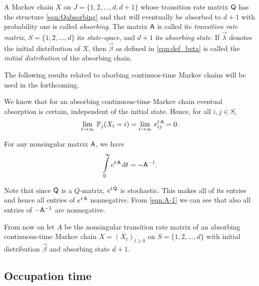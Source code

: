 \documentclass[smallextended]{svjour3}
\renewcommand{\P}{\mathbb{P}}
\newcommand{\intl}{\int\limits}
\begin{document}
\begin{definition}
A Markov chain $X$ on $J = \{1,2,\ldots,d,d+1\}$ whose transition rate matrix $\mathsf{Q}$ has the structure \eqref{eqn:Qabsorbing} and that will eventually be absorbed to $d+1$ with probability one is called \emph{absorbing}.
The matrix $\mathsf{A}$ is called its \emph{transition rate matrix}, $S=\{1,2,\ldots,d\}$ its \emph{state-space}, and $d+1$ its \emph{absorbing state}.
If $\vec{\lambda}$ denotes the initial distribution of $X$, then $\vec{\beta}$ as defined in \eqref{eqn:def_beta} is called the \emph{initial distribution} of the absorbing chain.
\end{definition}

The following results related to aborbing continuos-time Markov chains will be used in the forthcoming.

\begin{remark}\label{rem:P_vanishes}
We know that for an absorbing continuous-time Markov chain eventual absorption is certain, independent of the initial state.
Hence, for all $i,j\in S$,
\begin{equation*}
    \lim_{t\to\infty}\,\P_j(X_t=i)=\lim_{t\to\infty}\,e^{t\,\tens{A}}_{ij}=0.
\end{equation*}
\end{remark}

\begin{lemma}
    For any nonsingular matrix $\mathsf{A}$, we have
    \begin{equation}\label{eqn:A-1}
        \intl_0^\infty e^{t\,\tens{A}}\,\mathrm{d}t = -\tens{A}^{-1}.
    \end{equation}
\end{lemma}

\begin{remark}\label{rem:-A-1_nonnegative}
Note that since $\mathsf{Q}$ is a $Q$-matrix, $e^{t\,\mathsf{Q}}$ is stochastic.
This makes all of its entries and hence all entries of $e^{t\,\mathsf{A}}$ nonnegative.
From \eqref{eqn:A-1} we can see that also all entries of $-\mathsf{A}^{-1}$ are nonnegative.
\end{remark}

From now on let $A$ be the nonsingular transition rate matrix of an absorbing continuous-time Markov chain $X=(X_t)_{t\geq0}$ on $S=\{1,2,\ldots,d\}$ with initial distribution $\vec{\beta}$ and absorbing state $d+1$.

\subsection{Occupation time}
\end{document}
